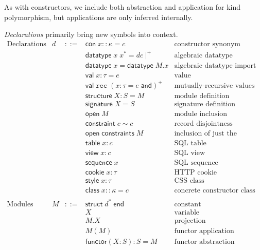 \documentclass{article}
\newcommand{\cd}[1]{\texttt{#1}}
\newcommand{\mt}[1]{\mathsf{#1}}
\begin{document}
As with constructors, we include both abstraction and application for kind polymorphism, but applications are only inferred internally.

\emph{Declarations} primarily bring new symbols into context.
$$\begin{array}{rrcll}
  \textrm{Declarations} & d &::=& \mt{con} \; x :: \kappa = c & \textrm{constructor synonym} \\
  &&& \mt{datatype} \; x \; x^* = dc\mid^+ & \textrm{algebraic datatype definition} \\
  &&& \mt{datatype} \; x = \mt{datatype} \; M.x & \textrm{algebraic datatype import} \\
  &&& \mt{val} \; x : \tau = e & \textrm{value} \\
  &&& \mt{val} \; \cd{rec} \; (x : \tau = e \; \mt{and})^+ & \textrm{mutually-recursive values} \\
  &&& \mt{structure} \; X : S = M & \textrm{module definition} \\
  &&& \mt{signature} \; X = S & \textrm{signature definition} \\
  &&& \mt{open} \; M & \textrm{module inclusion} \\
  &&& \mt{constraint} \; c \sim c & \textrm{record disjointness constraint} \\
  &&& \mt{open} \; \mt{constraints} \; M & \textrm{inclusion of just the constraints from a module} \\
  &&& \mt{table} \; x : c & \textrm{SQL table} \\
  &&& \mt{view} \; x : c & \textrm{SQL view} \\
  &&& \mt{sequence} \; x & \textrm{SQL sequence} \\
  &&& \mt{cookie} \; x : \tau & \textrm{HTTP cookie} \\
  &&& \mt{style} \; x : \tau & \textrm{CSS class} \\
  &&& \mt{class} \; x :: \kappa = c & \textrm{concrete constructor class} \\
  \\
  \textrm{Modules} & M &::=& \mt{struct} \; d^* \; \mt{end} & \textrm{constant} \\
  &&& X & \textrm{variable} \\
  &&& M.X & \textrm{projection} \\
  &&& M(M) & \textrm{functor application} \\
  &&& \mt{functor}(X : S) : S = M & \textrm{functor abstraction} \\
\end{array}$$
\end{document}
